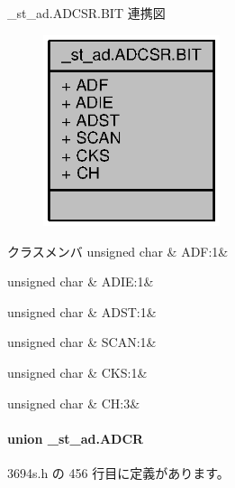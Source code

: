 \+\_\+st\+\_\+ad.\+A\+D\+C\+S\+R.\+B\+I\+T 連携図
\nopagebreak
\begin{figure}[H]
\begin{center}
\leavevmode
\includegraphics[width=147pt]{da/d53/struct__st__ad_8ADCSR_8BIT__coll__graph}
\end{center}
\end{figure}
\begin{DoxyFields}{クラスメンバ}
unsigned char\label{3694s_8h_afab97d859f75da65733a934f7825e8e5}
&
A\+D\+F\+:1&
\\
\hline

unsigned char\label{3694s_8h_abf59830faa2d0251c2c4362e8c1779be}
&
A\+D\+I\+E\+:1&
\\
\hline

unsigned char\label{3694s_8h_a27ce8973a2b07ed1540c5faa32ba8342}
&
A\+D\+S\+T\+:1&
\\
\hline

unsigned char\label{3694s_8h_ae0740abfbc61bc2be0bfa78af61106ae}
&
S\+C\+A\+N\+:1&
\\
\hline

unsigned char\label{3694s_8h_a62e08e3df930b3022644f9943263a758}
&
C\+K\+S\+:1&
\\
\hline

unsigned char\label{3694s_8h_a1ee0bf89c5d1032317d13a2e022793c8}
&
C\+H\+:3&
\\
\hline

\end{DoxyFields}
\label{union__st__ad_8ADCR}
\paragraph{union \+\_\+st\+\_\+ad.\+A\+D\+C\+R}


 3694s.\+h の 456 行目に定義があります。



